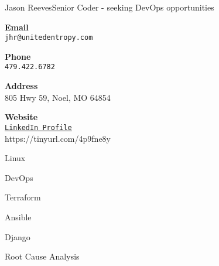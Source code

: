 \documentclass{article}
\begin{document}
\raggedbottom
\begin{cv}[avatar]{Jason Reeves}{Senior Coder - seeking DevOps opportunities}
\cvsidebar %



\begin{cvitem}[Envelope][4]
    \textbf{Email}\\
    \texttt{jhr@unitedentropy.com}
\end{cvitem}

\cvseparator[3]
\begin{cvitem}[Phone][4]
    \textbf{Phone}\\
    \texttt{479.422.6782}
\end{cvitem}

\cvseparator[3]
\begin{cvitem}[Home][4]
    \textbf{Address}\\
    805 Hwy 59, Noel, MO  64854
\end{cvitem}

\cvseparator[3]
\begin{cvitem}[Globe][4]
    \textbf{Website}\\
    \href{https://tinyurl.com/4p9fne8y}{\underline{\texttt{LinkedIn Profile}}} \\
    https://tinyurl.com/4p9fne8y
\end{cvitem}



\begin{cvitem}
    Linux
\end{cvitem}

\cvseparator
\begin{cvitem}
    DevOps
\end{cvitem}

\cvseparator
\begin{cvitem}
    Terraform
\end{cvitem}

\cvseparator
\begin{cvitem}
    Ansible
\end{cvitem}

\cvseparator
\begin{cvitem}
    Django
\end{cvitem}

\cvseparator
\begin{cvitem}
    Root Cause Analysis
\end{cvitem}


\end{cv}
\end{document}
